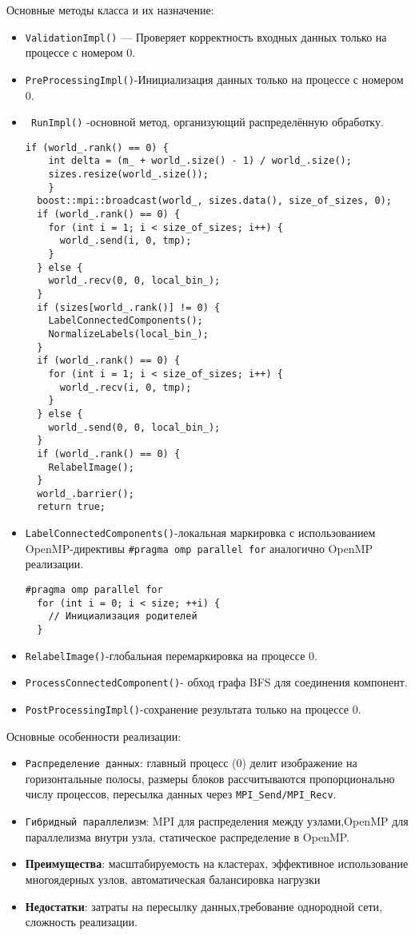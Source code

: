 \documentclass[12pt]{extarticle}
\begin{document}
Основные методы класса и их назначение:
\begin{itemize}
    \item \texttt{ValidationImpl()} — Проверяет корректность входных данных только на процессе с номером 0.
    \item \texttt{PreProcessingImpl()}-Инициализация данных только на процессе с номером 0.
     \item \texttt{ RunImpl()} -основной метод, организующий распределённую обработку.
      \begin{lstlisting}[caption={Распределенная обработка изображения},label={all}]
     if (world_.rank() == 0) {
    int delta = (m_ + world_.size() - 1) / world_.size();
    sizes.resize(world_.size());
    }
  boost::mpi::broadcast(world_, sizes.data(), size_of_sizes, 0);
  if (world_.rank() == 0) {
    for (int i = 1; i < size_of_sizes; i++) {
      world_.send(i, 0, tmp);  
    }
  } else {
    world_.recv(0, 0, local_bin_);
  }
  if (sizes[world_.rank()] != 0) {
    LabelConnectedComponents();  
    NormalizeLabels(local_bin_); 
  }
  if (world_.rank() == 0) {
    for (int i = 1; i < size_of_sizes; i++) {
      world_.recv(i, 0, tmp);
    }
  } else {
    world_.send(0, 0, local_bin_);
  }
  if (world_.rank() == 0) {
    RelabelImage(); 
  }
  world_.barrier();
  return true;
 \end{lstlisting}
  \item \texttt{LabelConnectedComponents()}-локальная маркировка с использованием OpenMP-директивы  \texttt{\#pragma omp parallel for} аналогично  OpenMP реализации.
  \begin{lstlisting}[caption={локальная маркировка с использованием OpenMP},label={all}]
  #pragma omp parallel for
  for (int i = 0; i < size; ++i) {
    // Инициализация родителей
  }
  \end{lstlisting}
  \item\texttt{RelabelImage()}-глобальная перемаркировка на процессе 0.
  \item\texttt{ProcessConnectedComponent()}- обход графа BFS для соединения компонент.
  \item\texttt{PostProcessingImpl()}-сохранение результата только на процессе 0.
\end{itemize}

Основные особенности реализации:
\begin{itemize}
    \item\texttt{Распределение данных}: главный процесс (0) делит изображение на горизонтальные полосы, размеры блоков рассчитываются пропорционально числу процессов, пересылка данных через \texttt{MPI\_Send/MPI\_Recv}.
     \item\texttt{Гибридный параллелизм}: MPI для распределения между узлами,OpenMP для параллелизма внутри узла, статическое распределение в OpenMP.
    \item \textbf{Преимущества}: масштабируемость на кластерах, эффективное использование многоядерных узлов, автоматическая балансировка нагрузки
    \item \textbf{Недостатки}: затраты на пересылку данных,требование однородной сети, сложность реализации.
\end{itemize}
\end{document}
